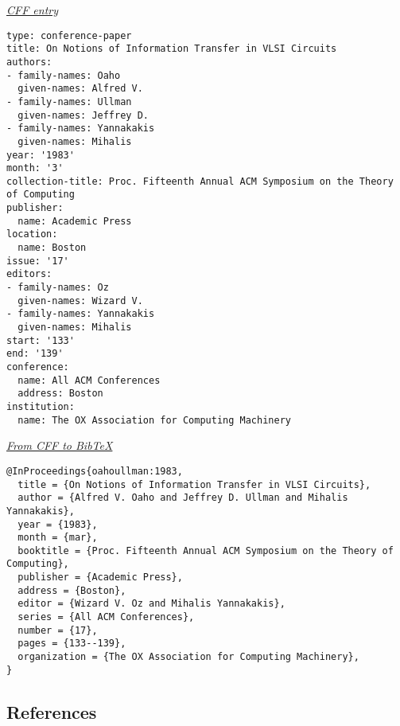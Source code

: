\documentclass[
]{article}
\begin{document}
\underline{\emph{CFF entry}}

\begin{verbatim}
type: conference-paper
title: On Notions of Information Transfer in VLSI Circuits
authors:
- family-names: Oaho
  given-names: Alfred V.
- family-names: Ullman
  given-names: Jeffrey D.
- family-names: Yannakakis
  given-names: Mihalis
year: '1983'
month: '3'
collection-title: Proc. Fifteenth Annual ACM Symposium on the Theory of Computing
publisher:
  name: Academic Press
location:
  name: Boston
issue: '17'
editors:
- family-names: Oz
  given-names: Wizard V.
- family-names: Yannakakis
  given-names: Mihalis
start: '133'
end: '139'
conference:
  name: All ACM Conferences
  address: Boston
institution:
  name: The OX Association for Computing Machinery
\end{verbatim}

\underline{\emph{From CFF to BibTeX}}

\begin{verbatim}
@InProceedings{oahoullman:1983,
  title = {On Notions of Information Transfer in VLSI Circuits},
  author = {Alfred V. Oaho and Jeffrey D. Ullman and Mihalis Yannakakis},
  year = {1983},
  month = {mar},
  booktitle = {Proc. Fifteenth Annual ACM Symposium on the Theory of Computing},
  publisher = {Academic Press},
  address = {Boston},
  editor = {Wizard V. Oz and Mihalis Yannakakis},
  series = {All ACM Conferences},
  number = {17},
  pages = {133--139},
  organization = {The OX Association for Computing Machinery},
}
\end{verbatim}

\hypertarget{references}{%
\subsection*{References}\label{references}}
\end{document}
